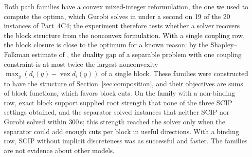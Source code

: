 Both path families have a convex mixed-integer reformulation, the one we used
to compute the optima, which Gurobi solves in under a second on 19 of the 20
instances of Part~4C4; the experiment therefore tests whether a solver
recovers the block structure from the nonconvex formulation. With a single
coupling row, the block closure is close to the optimum for a known reason:
by the Shapley--Folkman estimate of \citet{AubinEkeland1976}, the duality gap
of a separable problem with one coupling constraint is at most twice the
largest nonconvexity $\max_y(d_i(y)-\operatorname{vex}d_i(y))$ of a single block. These
families were constructed to have the structure of
Section~\ref{sec:composition}, and their objectives are sums of block
functions, which favors block cuts. On the family with a non-binding row,
exact block support supplied root strength that none of the three SCIP
settings obtained, and the separator solved instances that neither SCIP nor
Gurobi solved within 300\,s; this strength reached the solver only when the
separator could add enough cuts per block in useful directions. With a binding
row, SCIP without implicit discreteness was as successful and faster. The
families are not evidence about other models.
